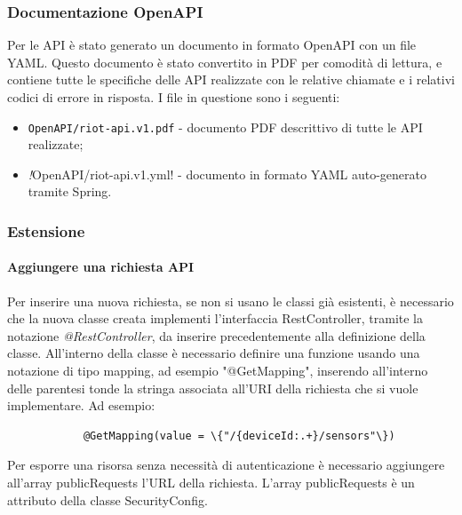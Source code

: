 	\subsubsection{Documentazione OpenAPI}

	Per le API è stato generato un documento in formato OpenAPI con un file YAML. Questo documento è stato convertito in PDF per comodità di lettura, e contiene tutte le specifiche delle API realizzate con le relative chiamate e i relativi codici di errore in risposta.
	I file in questione sono i seguenti:
	\begin{itemize}
		\item \verb!OpenAPI/riot-api.v1.pdf! - documento PDF descrittivo di tutte le API realizzate;
		\item \textit!OpenAPI/riot-api.v1.yml! - documento in formato YAML auto-generato tramite Spring.
	\end{itemize}
	
	\subsubsection{Estensione}
		\paragraph{Aggiungere una richiesta API}
			Per inserire una nuova richiesta, se non si usano le classi già esistenti, è necessario che la nuova classe creata implementi l'interfaccia RestController, tramite la notazione \textit{@RestController}, da inserire precedentemente alla definizione della classe.
			\newline
			All'interno della classe è necessario definire una funzione usando una notazione di tipo mapping, ad esempio "@GetMapping", inserendo all'interno delle parentesi tonde la stringa associata all'URI della richiesta che si vuole implementare.
			Ad esempio:
			\begin{verbatim}
			@GetMapping(value = \{"/{deviceId:.+}/sensors"\})
			\end{verbatim}
			Per esporre una risorsa senza necessità di autenticazione è necessario aggiungere all'array publicRequests l'URL della richiesta. L'array publicRequests è un attributo della classe SecurityConfig.